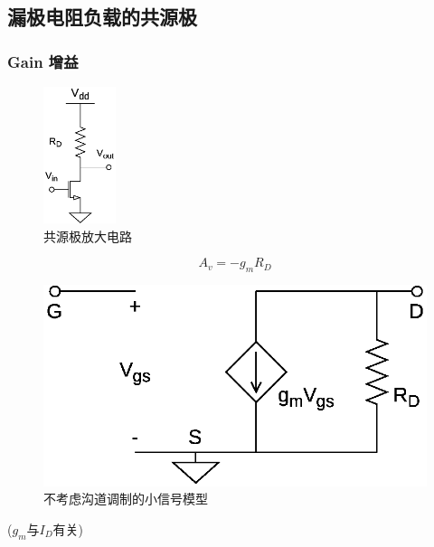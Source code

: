 \documentclass[twoside,a4paper,openright,titlepage,draft]{ctexrep}
\begin{document}
\subsection{漏极电阻负载的共源极}
\vspace*{1em}
\subsubsection{Gain 增益}
\begin{multicols}{2}
    \begin{figure}[H]
        \centering
        \includegraphics[height=40mm]{bigsignal.eps}
        \caption{共源极放大电路}
        \label{fig:共源极放大电路}
    \end{figure}
    \columnbreak
    \begin{equation}
        A_v = -g_mR_D
    \end{equation}
    \newpage
    \begin{figure}[H]
        \centering
        \includegraphics[width=\columnwidth]{commonsource.eps}
        \caption{不考虑沟道调制的小信号模型}
        \label{fig:共源无沟道调制小信号}
    \end{figure}
    \columnbreak
    \centering
    ($g_m$与$I_D$有关)
\end{multicols}
\par
\end{document}

